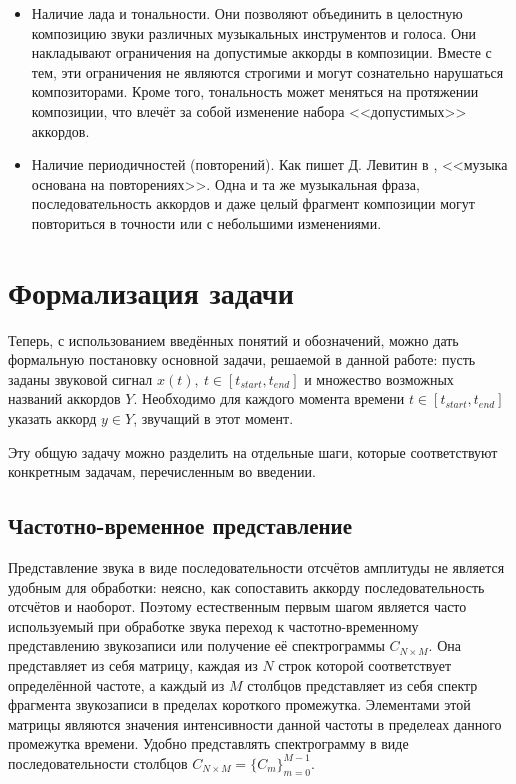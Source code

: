 \begin{itemize}
  \item Наличие лада и тональности. Они позволяют объединить в целостную
  композицию звуки различных музыкальных инструментов и голоса. Они накладывают
  ограничения на допустимые аккорды в композиции. Вместе с тем, эти ограничения
  не являются строгими и могут сознательно нарушаться композиторами. Кроме того,
  тональность может меняться на протяжении композиции, что влечёт за собой
  изменение набора <<допустимых>> аккордов.
  
  \item Наличие периодичностей (повторений). Как пишет Д. Левитин в  
  \cite{Levitin2006}, <<музыка основана на повторениях>>. Одна и та же
  музыкальная фраза, последовательность аккордов и даже целый фрагмент
  композиции могут повториться в точности или с небольшими изменениями.
\end{itemize}

\section{Формализация задачи} \label{sectT_task}

Теперь, с использованием введённых понятий и обозначений, можно дать
формальную постановку основной задачи, решаемой в данной работе:
пусть заданы звуковой сигнал $x(t),~t \in [t_{start}, t_{end}]$ и множество
возможных названий аккордов $Y$. Необходимо для каждого момента времени $t \in
[t_{start}, t_{end}]$ указать аккорд $y \in Y$, звучащий в этот момент.

Эту общую задачу можно разделить на отдельные шаги, которые соответствуют
конкретным задачам, перечисленным во введении.

\subsection{Частотно-временное представление}

Представление звука в виде последовательности отсчётов амплитуды не является
удобным для обработки: неясно, как сопоставить аккорду последовательность
отсчётов и наоборот. Поэтому естественным первым шагом является часто
используемый при обработке звука переход к частотно-временному представлению
звукозаписи или получение её спектрограммы $C_{N \times M}$. Она представляет
из себя матрицу, каждая из $N$ строк которой соответствует определённой
частоте, а каждый из $M$ столбцов представляет из себя спектр фрагмента
звукозаписи в пределах короткого промежутка. Элементами этой матрицы являются
значения интенсивности данной частоты в пределеах данного промежутка времени.
Удобно представлять спектрограмму в виде последовательности столбцов $C_{N
\times M} = \{C_m\}_{m=0}^{M-1}$.


